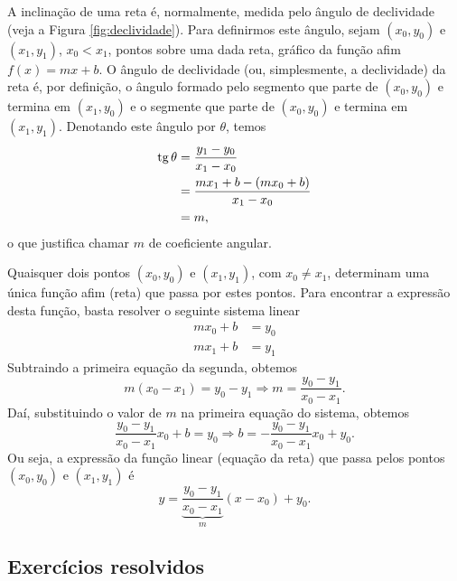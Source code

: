 A inclinação de uma reta é, normalmente, medida pelo ângulo de declividade (veja a Figura \ref{fig:declividade}). Para definirmos este ângulo, sejam $(x_0, y_0)$ e $(x_1, y_1)$, $x_0<x_1$, pontos sobre uma dada reta, gráfico da função afim $f(x)=mx+b$. O ângulo de declividade (ou, simplesmente, a declividade) da reta é, por definição, o ângulo formado pelo segmento que parte de $(x_0, y_0)$ e termina em $(x_1, y_0)$ e o segmente que parte de $(x_0, y_0)$ e termina em $(x_1, y_1)$. Denotando este ângulo por $\theta$, temos
\begin{align}
  \operatorname{tg}\theta &= \frac{y_1-y_0}{x_1-x_0}\\
            &= \frac{mx_1+b-(mx_0+b)}{x_1-x_0}\\
            &= m,
\end{align}
o que justifica chamar $m$ de coeficiente angular.

Quaisquer dois pontos $(x_0, y_0)$ e $(x_1, y_1)$, com $x_0\neq x_1$, determinam uma única função afim (reta) que passa por estes pontos. Para encontrar a expressão desta função, basta resolver o seguinte sistema linear
\begin{align}
  mx_0 + b &= y_0\\
  mx_1 + b &= y_1
\end{align}
Subtraindo a primeira equação da segunda, obtemos
\begin{equation}
  m(x_0-x_1) = y_0-y_1 \Rightarrow m = \frac{y_0-y_1}{x_0-x_1}.
\end{equation}
Daí, substituindo o valor de $m$ na primeira equação do sistema, obtemos
\begin{equation}
  \frac{y_0-y_1}{x_0-x_1}x_0 + b = y_0 \Rightarrow b = -\frac{y_0-y_1}{x_0-x_1}x_0 + y_0.
\end{equation}
Ou seja, a expressão da função linear (equação da reta) que passa pelos pontos $(x_0, y_0)$ e $(x_1, y_1)$ é
\begin{equation}\label{eq:funafim_eq}
  y = \underbrace{\frac{y_0-y_1}{x_0-x_1}}_{m}(x-x_0) + y_0.
\end{equation}

\subsection*{Exercícios resolvidos}

